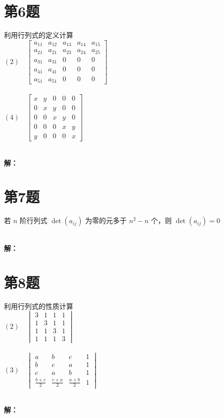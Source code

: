 \documentclass[a4paper, 12pt]{ctexart}
\begin{document}
\section{第6题}
\begin{exercise}
利用行列式的定义计算\\


$
(2) \quad 
\begin{bmatrix}
 a_{11}& a_{12} &a_{13}  & a_{14} &a_{15} \\
 a_{21}& a_{21} & a_{23} & a_{24} & a_{25}\\
 a_{31}& a_{31} & 0 & 0 & 0\\
 a_{41}& a_{41} & 0 & 0 & 0\\
 a_{51}& a_{51} & 0 & 0 & 0
\end{bmatrix}$~\\~\\


$(4) \quad \begin{bmatrix}
  x&y  &0  &0  &0 \\
  0&x  &y  &0  &0 \\
  0&0  &x  &y  &0 \\
  0&0  &0  &x  &y \\
  y&0  &0  &0  &x
\end{bmatrix}$

\end{exercise}~\\
\noindent\textbf{解：}



\section{第7题}
\begin{exercise}
若 $n$ 阶行列式 $\det(a_{ij})$ 为零的元多于 $n^{2}-n$ 个，则 $\det(a_{ij})=0$
\end{exercise}~\\
\noindent\textbf{解：}

\section{第8题}
\begin{exercise}
利用行列式的性质计算\\

$(2) \quad \begin{vmatrix}
  3&  1& 1& 1\\
  1&  3& 1& 1\\
  1&  1& 3& 1\\
  1&  1& 1& 3
\end{vmatrix}$\\~\\

$(3) \quad \begin{vmatrix}
  a&  b&  c& 1\\
  b&  c&  a& 1\\
  c&  a&  b& 1\\
  \frac{b+c}{2}&  \frac{c+a}{2}&  \frac{a+b}{2}& 1
\end{vmatrix}$
\end{exercise}~\\
\noindent\textbf{解：}
\end{document}
